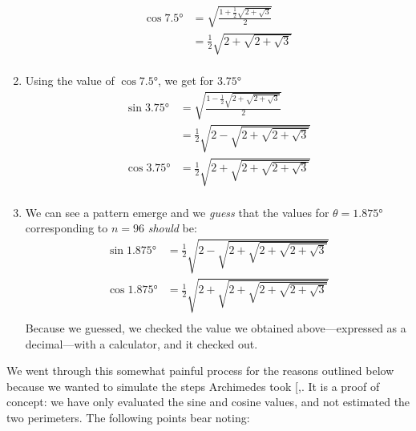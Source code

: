\documentclass[
  a4paper,
]{article}
\begin{document}
\begin{enumerate}
\[\begin{aligned}
  \cos 7.5° &= \sqrt{\frac{1 + \frac{1}{2}\sqrt{2 + \sqrt{3}}}{2}}\\
  &= \frac{1}{2}\sqrt{2 + \sqrt{2 + \sqrt{3}}}\\ 
  \end{aligned}
  \]
\item
  Using the value of \(\cos 7.5°\), we get for \(3.75°\) \[
  \begin{aligned}
  \sin 3.75° &= \sqrt{\frac{1 - \frac{1}{2}\sqrt{2 + \sqrt{2 + \sqrt{3}}}}{2}}\\
  &= \frac{1}{2}\sqrt{2 - \sqrt{2 + \sqrt{2 + \sqrt{3}}}}\\
  \cos 3.75° &= \frac{1}{2}\sqrt{2 + \sqrt{2 + \sqrt{2 + \sqrt{3}}}}\\
  \end{aligned}
  \]
\item
  We can see a pattern emerge and we \emph{guess} that the values for
  \(\theta = 1.875°\) corresponding to \(n=96\) \emph{should} be: \[
  \begin{aligned}
  \sin 1.875° &= \frac{1}{2}\sqrt{2 - \sqrt{2 + \sqrt{2 + \sqrt{2 + \sqrt{3}}}}}\\
  \cos 1.875° &= \frac{1}{2}\sqrt{2 + \sqrt{2 + \sqrt{2 + \sqrt{2 + \sqrt{3}}}}}\\
  \end{aligned}
  \] Because we guessed, we checked the value we obtained
  above---expressed as a decimal---with a calculator, and it checked
  out.
\end{enumerate}

We went through this somewhat painful process for the reasons outlined
below because we wanted to simulate the steps Archimedes took
{[},\citeproc{ref-damini-dhar-2020}{2}{]}.
It is a proof of concept: we have only evaluated the sine and cosine
values, and not estimated the two perimeters. The following points bear
noting:
\end{document}
